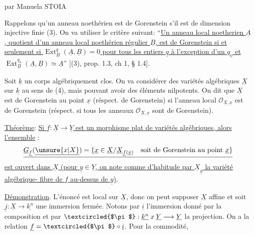 \begin{center}

par Manuela STOIA
\end{center}

Rappelons qu'un anneau noethérien est de Gorenstein s'il est de dimension injective finie (3). On va utiliser le critère suivant: ``\uline{Un anneau local noetherien $\underline A$, quotient d'un anneau local noethérien régulier $\underline B$, est de Gorenstein si et seulement si $\operatorname{Ext}^{q}_{\underline B}(\underline A,\underline B)=0$ pour tous les entiers $\underline q$ à l'exception d'un $q_{\underline o}$ et $\operatorname{Ext}^{q_o}_{\underline B}(\underline A,\underline B)\simeq\underline A$}'' [(3), prop. 1.3, ch 1, § 1.4].

Soit $\underline k$ un corps algébriquement clos. On va considérer des variétés algébriques $\underline X$ sur $\underline k$ au sens de (4), mais pouvant avoir des éléments nilpotents. On dit que $\underline X$ est de Gorenstein au point $\underline x$ (réspect. de Gorenstein) si l'anneau local $\mathcal O_{\underline X,\underline x}$ est de Gorenstein (réspect. si tous les anneaux $\mathcal O_{\underline X,\underline x}$ sont de Gorenstein).

\uline{Théorème}: \uline{Si $\underline f:\underline X\longrightarrow\underline Y$ est un morphisme plat de variétés algébriques, alors l'ensemble} :
\[
\underline{\underline G_{\underline f}(\underline{\unsure{x|X}})=\{\underline x\in\underline X/\underline X_{\underline f(\underline x)}\quad\text{soit de Gorenstein au point }\underline x\}}
\]
\uline{est ouvert dans $\underline X$ (pour $\underline y\in\underline Y$, on note comme d'habitude par $\underline X_{\underline y}$ la variété algébrique- fibre de $\underline f$ au-dessus de $\underline y$)}.

\uline{Démonstration}. L'énoncé est local sur $\underline X$, donc on peut supposer $\underline X$ affine et soit $\underline j:\underline X\longrightarrow\underline{k^n}$ une immersion fermée. Notons par $\underline i$ l'immersion donné par la composition
et par $\textcircled{$\pi$}:\underline{k^n}\mathbin{x}\underline Y\longrightarrow\underline Y$ la projection. On a la relation $\underline f=\textcircled{$\pi$}\circ\underline i$. Pour la commodité,
